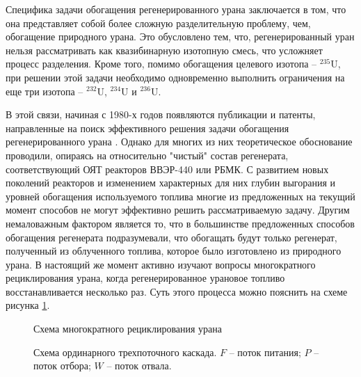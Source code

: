 Специфика задачи обогащения регенерированного урана заключается в том, что она представляет собой более сложную разделительную проблему, чем, обогащение  природного урана.
Это обусловлено тем, что, регенерированный уран нельзя рассматривать как квазибинарную изотопную смесь, что усложняет процесс разделения. Кроме того, помимо обогащения целевого изотопа -- $^{235}$U, при решении этой задачи необходимо одновременно выполнить ограничения на еще три изотопа -- $^{232}$U, $^{234}$U и $^{236}$U.

В этой связи, начиная с 1980-х годов появляются публикации и патенты, направленные на поиск эффективного решения задачи обогащения регенерированного урана \cite{smirnovKaskadnyeShemyZadachah2012,sulaberidzeNekotoryhRazdelitelnyhProblemah2004,kazukihidaSimultaneousEvaluationEffects1986,sidenkoIssledovanieKaskadnyhShem,smirnovObogashchenieRegenerirovannogoUrana2018,prusakovKorrekciyaIzotopnogoSostava2008}. Однако для многих из них теоретическое обоснование проводили, опираясь на относительно "чистый" состав регенерата, соответствующий ОЯТ реакторов ВВЭР-440 или РБМК. С развитием новых поколений реакторов и изменением характерных для них глубин выгорания и уровней обогащения используемого топлива многие из предложенных на текущий момент способов не могут эффективно решить рассматриваемую задачу.
Другим немаловажным фактором является то, что в большинстве предложенных способов обогащения регенерата подразумевали, что обогащать будут только регенерат, полученный из облученного топлива, которое было изготовлено из природного урана. В настоящий же момент активно изучают вопросы многократного рециклирования урана, когда регенерированное урановое топливо восстанавливается несколько раз. Суть этого процесса можно пояснить на схеме рисунка \ref{recycle}.

\begin{figure}[ht]
  \caption{Схема многократного рециклирования урана}\label{recycle}
\end{figure}

\begin{figure}[ht]
  \caption{Схема ординарного трехпоточного каскада. $F$ -- поток питания; $P$ -- поток отбора; $W$ -- поток отвала.}\label{ordinary}
\end{figure}

